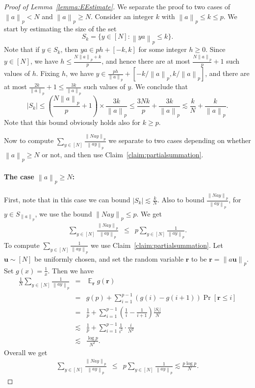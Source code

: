 \documentclass[11pt]{article}
\numberwithin{equation}{section}
\theoremstyle{definition}
\theoremstyle{plain}
\theoremstyle{definition}\newtheorem{problem}[theorem]{Problem}\theoremstyle{plain}
\DeclareMathOperator{\Ex}{{\mathbb E}}
\newcommand{\Bu}{\mathbf{u}}   %
\newcommand{\Br}{\mathbf{r}}   %
\newcommand{\norm}[1]{\left\| #1 \right\|_p}
\begin{document}
\begin{proof}[Proof of Lemma~\ref{lemma:EEstimate}]
We separate the proof to two cases of $\norm{a} < N$ and $\norm{a} \geq N$.
Consider an integer $k$ with   $\norm{a} \le k \le p$. We start by  estimating the size of the set
$$S_k=\{y \in [N] : \norm{ya} \le k\}.$$
Note that if $y \in S_k$, then $y a  \in p h + [-k,k]$ for some integer $h \ge 0$. Since $y \in [N]$,  we have
$h \le \frac{N\norm{a}+k}{p}$,
and hence there are at most $\frac{N\norm{a}}{p}+1$ such values of $h$. Fixing $h$, we have $y \in \frac{ph}{\norm{a}} + [-k/\norm{a}, k/\norm{a}]$, and there are at most $\frac{2k}{\norm{a}}+1 \le \frac{3k}{\norm{a}}$ such values of $y$. We conclude that
\begin{equation*}
|S_k| \le  \left(\frac{N\norm{a}}{p}+1\right) \times \frac{3k}{\norm{a}}  \le \frac{3Nk}{p} +  \frac{3k}{\norm{a}}\lesssim \frac{k}{N} + \frac{k}{\norm{a}}.
\end{equation*}
Note that this bound obviously  holds  also for $k \ge p$.




%
%
%
%
%
%
%
%
%
%
%
%
%
%
%
%
%

Now to compute $\sum_{y \in [N]} \frac{\norm{Nay}}{\norm{ay}}$ we separate to two cases depending on whether $\norm{a}\geq N$ or not, and then use Claim~\ref{claim:partialsummation}.

\paragraph{The case $ \norm{a} \ge N$:}

First, note that in this case we can bound  $|S_k| \lesssim \frac{k}{N}$. Also to bound $\frac{\norm{Nay}}{\norm{ay}}$,
	 for $y\in S_{\norm{a}}$, we use the bound $\norm{Nay}\leq p$.
 We get
\begin{eqnarray*}
	\sum_{y \in [N]} \frac{\norm{Nay}}{\norm{ay}}
	&\leq&   p\sum_{y \in [N]} \frac{1}{\norm{ay}}.
	\end{eqnarray*}
	To compute $\sum_{y \in [N]} \frac{1}{\norm{ay}}$ we use Claim~\ref{claim:partialsummation}. Let $\Bu \sim [N]$ be uniformly chosen, and set the random variable $\Br$ to be $\Br = \norm{a\Bu}$. Set $g(x) = \frac{1}{x}$. Then we have
	\begin{eqnarray*}
\frac{1}{N}	\sum_{y \in [N]} \frac{1}{\norm{ay}}
        &=& \Ex_{\Br} g(\Br) \\
		&=& g(p)+ \sum_{i=1}^{p-1} \left(g(i)-g(i+1)\right) \Pr[\Br \leq i]\\
		&=& \frac{1}{p} + \sum_{i=1}^{p-1} \left(\frac{1}{i}-\frac{1}{i+1}\right) \frac{|S_i|}{N}\\
		&\lesssim& \frac{1}{p} + \sum_{i=1}^{p-1} \frac{1}{i^2} \cdot \frac{i}{N^2}\\
		&\lesssim&\frac{\log p}{N^2}.
  \end{eqnarray*}
Overall we get
\begin{eqnarray*}
	\sum_{y \in [N]} \frac{\norm{Nay}}{\norm{ay}}
	&\leq& p\sum_{y \in [N]} \frac{1}{\norm{ay}}\lesssim \frac{p\log p}{N} .
	\end{eqnarray*}

\end{proof}
\end{document}
